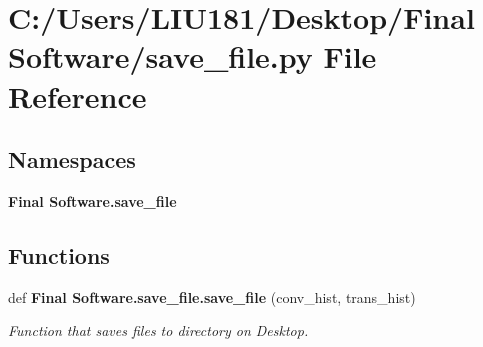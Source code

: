 \section{C\+:/\+Users/\+L\+I\+U181/\+Desktop/\+Final Software/save\+\_\+file.py File Reference}
\label{save__file_8py}
\subsection*{Namespaces}
\begin{DoxyCompactItemize}
\item 
 \textbf{ Final Software.\+save\+\_\+file}
\end{DoxyCompactItemize}
\subsection*{Functions}
\begin{DoxyCompactItemize}
\item 
def \textbf{ Final Software.\+save\+\_\+file.\+save\+\_\+file} (conv\+\_\+hist, trans\+\_\+hist)
\begin{DoxyCompactList}\small\item\em Function that saves files to directory on Desktop. \end{DoxyCompactList}\end{DoxyCompactItemize}
